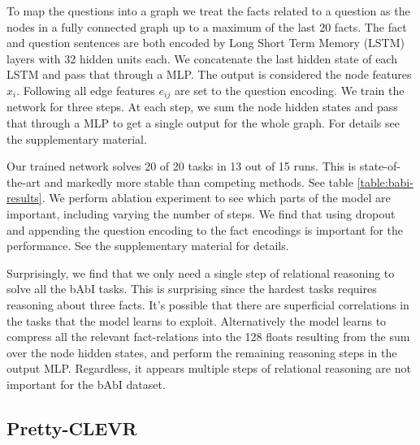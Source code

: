 \documentclass{article}
\begin{document}
To map the questions into a graph we treat the facts related to a question as the nodes in a fully connected graph up to a maximum of the last 20 facts. The fact and question sentences are both encoded by Long Short Term Memory (LSTM) \citep{hochreiter1997long} layers  with 32 hidden units each. We concatenate the last hidden state of each LSTM and pass that through a MLP. The output is considered the node features $x_i$. Following \citep{santoro2017simple} all edge features $e_{ij}$ are set to the question encoding. We train the network for three steps.
At each step, we sum the node hidden states and pass that through a MLP to get a single output for the whole graph. For details see the supplementary material.

Our trained network solves 20 of 20 tasks in 13 out of 15 runs. This is state-of-the-art and markedly more stable than competing methods. See table \ref{table:babi-results}. We perform ablation experiment to see which parts of the model are important, including varying the number of steps. We find that using dropout and appending the question encoding to the fact encodings is important for the performance. See the supplementary material for details.

Surprisingly, we find that we only need a single step of relational reasoning to solve all the bAbI tasks. This is surprising since the hardest tasks requires reasoning about three facts. It's possible that there are superficial correlations in the tasks that the model learns to exploit. Alternatively the model learns to compress all the relevant fact-relations into the 128 floats resulting from the sum over the node hidden states, and perform the remaining reasoning steps in the output MLP. Regardless, it appears multiple steps of relational reasoning are not important for the bAbI dataset.

\subsection{Pretty-CLEVR}

\end{document}
